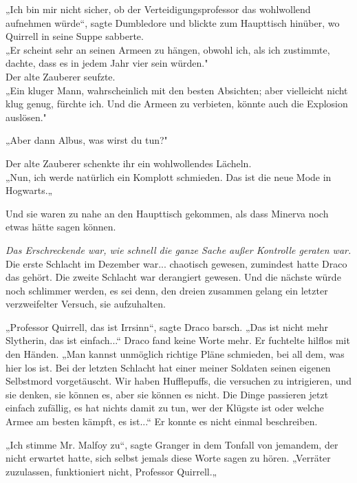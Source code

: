 {„Ich bin mir nicht sicher, ob der Verteidigungsprofessor das wohlwollend aufnehmen würde“, sagte Dumbledore und blickte zum Haupttisch hinüber, wo Quirrell in seine Suppe sabberte.\\ „Er scheint sehr an seinen Armeen zu hängen, obwohl ich, als ich zustimmte, dachte, dass es in jedem Jahr vier sein würden."\\ Der alte Zauberer seufzte.\\ „Ein kluger Mann, wahrscheinlich mit den besten Absichten; aber vielleicht nicht klug genug, fürchte ich. Und die Armeen zu verbieten, könnte auch die Explosion auslösen."

„Aber dann Albus, was wirst du tun?"

Der alte Zauberer schenkte ihr ein wohlwollendes Lächeln.\\ „Nun, ich werde natürlich ein Komplott schmieden. Das ist die neue Mode in Hogwarts.„

Und sie waren zu nahe an den Haupttisch gekommen, als dass Minerva noch etwas hätte sagen können.

\emph{Das Erschreckende war, wie schnell die ganze Sache außer Kontrolle geraten war.} Die erste Schlacht im Dezember war... chaotisch gewesen, zumindest hatte Draco das gehört. Die zweite Schlacht war derangiert gewesen. Und die nächste würde noch schlimmer werden, es sei denn, den dreien zusammen gelang ein letzter verzweifelter Versuch, sie aufzuhalten.

„Professor Quirrell, das ist Irrsinn“, sagte Draco barsch. „Das ist nicht mehr Slytherin, das ist einfach...“ Draco fand keine Worte mehr. Er fuchtelte hilflos mit den Händen. „Man kannst unmöglich richtige Pläne schmieden, bei all dem, was hier los ist. Bei der letzten Schlacht hat einer meiner Soldaten seinen eigenen Selbstmord vorgetäuscht. Wir haben Hufflepuffs, die versuchen zu intrigieren, und sie denken, sie können es, aber sie können es nicht. Die Dinge passieren jetzt einfach zufällig, es hat nichts damit zu tun, wer der Klügste ist oder welche Armee am besten kämpft, es ist...“ Er konnte es nicht einmal beschreiben.

„Ich stimme Mr. Malfoy zu“, sagte Granger in dem Tonfall von jemandem, der nicht erwartet hatte, sich selbst jemals diese Worte sagen zu hören. „Verräter zuzulassen, funktioniert nicht, Professor Quirrell.„

}
